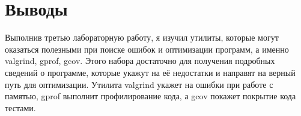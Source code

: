 \section{Выводы}
{\itshape }

Выполнив третью лабораторную работу, я изучил утилиты, которые могут оказаться полезными при поиске ошибок и оптимизации программ, а именно valgrind, gprof, gcov. Этого набора достаточно для получения подробных сведений о программе, которые укажут на её недостатки и направят на верный путь для оптимизации. Утилита valgrind укажет на ошибки при работе с памятью, gprof выполнит профилирование кода, а gcov покажет покрытие кода тестами. 

\pagebreak
